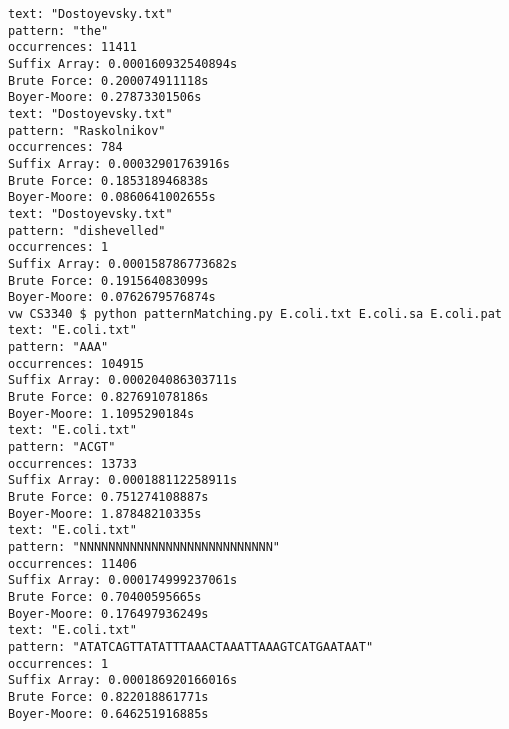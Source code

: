 \documentclass[10pt]{article}
\begin{document}
\begin{verbatim}
text: "Dostoyevsky.txt"
pattern: "the"
occurrences: 11411
Suffix Array: 0.000160932540894s
Brute Force: 0.200074911118s
Boyer-Moore: 0.27873301506s
text: "Dostoyevsky.txt"
pattern: "Raskolnikov"
occurrences: 784
Suffix Array: 0.00032901763916s
Brute Force: 0.185318946838s
Boyer-Moore: 0.0860641002655s
text: "Dostoyevsky.txt"
pattern: "dishevelled"
occurrences: 1
Suffix Array: 0.000158786773682s
Brute Force: 0.191564083099s
Boyer-Moore: 0.0762679576874s
vw CS3340 $ python patternMatching.py E.coli.txt E.coli.sa E.coli.pat
text: "E.coli.txt"
pattern: "AAA"
occurrences: 104915
Suffix Array: 0.000204086303711s
Brute Force: 0.827691078186s
Boyer-Moore: 1.1095290184s
text: "E.coli.txt"
pattern: "ACGT"
occurrences: 13733
Suffix Array: 0.000188112258911s
Brute Force: 0.751274108887s
Boyer-Moore: 1.87848210335s
text: "E.coli.txt"
pattern: "NNNNNNNNNNNNNNNNNNNNNNNNNNN"
occurrences: 11406
Suffix Array: 0.000174999237061s
Brute Force: 0.70400595665s
Boyer-Moore: 0.176497936249s
text: "E.coli.txt"
pattern: "ATATCAGTTATATTTAAACTAAATTAAAGTCATGAATAAT"
occurrences: 1
Suffix Array: 0.000186920166016s
Brute Force: 0.822018861771s
Boyer-Moore: 0.646251916885s
\end{verbatim}
\end{document}

